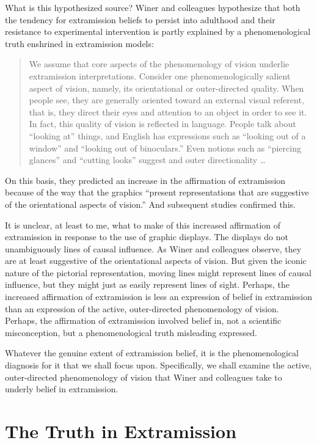 \documentclass[12pt]{article}
\begin{document}
What is this hypothesized source? Winer and colleagues hypothesize that both the tendency for extramission beliefs to persist into adulthood and their resistance to experimental intervention is partly explained by a phenomenological truth enshrined in extramission models:
\begin{quote}
	We assume that core aspects of the phenomenology of vision underlie extramission interpretations. Consider one phenomenologically salient aspect of vision, namely, its orientational or outer-directed quality. When people see, they are generally oriented toward an external visual referent, that is, they direct their eyes and attention to an object in order to see it. In fact, this quality of vision is reflected in language. People talk about ``looking at'' things, and English has expressions such as ``looking out of a window'' and ``looking out of binoculars.'' Even notions such as ``piercing glances'' and ``cutting looks'' suggest and outer directionality \ldots\ 
\end{quote}
On this basis, they predicted an increase in the affirmation of extramission because of the way that the graphics ``present representations that are suggestive of the orientational aspects of vision.'' And subsequent studies confirmed this.

It is unclear, at least to me, what to make of this increased affirmation of extramission in response to the use of graphic displays. The displays do not unambiguously lines of causal influence. As Winer and colleagues observe, they are at least suggestive of the orientational aspects of vision. But given the iconic nature of the pictorial representation, moving lines might represent lines of causal influence, but they might just as easily represent lines of sight. Perhaps, the increased affirmation of extramission is less an expression of belief in extramission than an expression of the active, outer-directed phenomenology of vision. Perhaps, the affirmation of extramission involved belief in, not a scientific misconception, but a phenomenological truth misleading expressed.

Whatever the genuine extent of extramission belief, it is the phenomenological diagnosis for it that we shall focus upon. Specifically, we shall examine the active, outer-directed phenomenology of vision that Winer and colleagues take to underly belief in extramission.


\section{The Truth in Extramission} %
\label{sec:the_truth_in_extramission}
\end{document}
